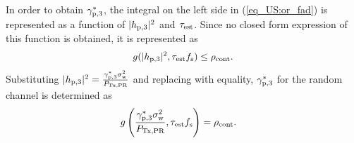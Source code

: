 {In order to obtain ${\gamma}_{\text{p,3}}^*$, the integral on the left side in (\ref{eq_US:or_fad}) is represented as a function of $|h_{\text{p,3}}|^2$ and $\tau_{\text{est}}$. Since no closed form expression of this function is obtained, it is represented as}
\begin{align*}
g(|h_{\text{p,3}}|^2, \tau_{\text{est}} f_{\text{s}}) \le \rho_{\text{cont}}. \nonumber   
\end{align*}
{Substituting $|h_{\text{p,3}}|^2 = \frac{{\gamma}_{\text{p,3}}^* \sigma^2_{\text{w}}}{P_{\text{Tx,PR}}}$ and replacing with equality, ${\gamma}_{\text{p,3}}^*$ for the random channel is determined as} 
\begin{align*}
g\left(\frac{{\gamma}_{\text{p,3}}^* \sigma^2_{\text{w}}}{P_{\text{Tx,PR}}}, \tau_{\text{est}} f_{\text{s}}\right) &= \rho_{\text{cont}}. \nonumber  
\end{align*}
\begin{figure}[!ht]


\centering
{}
\end{figure}
